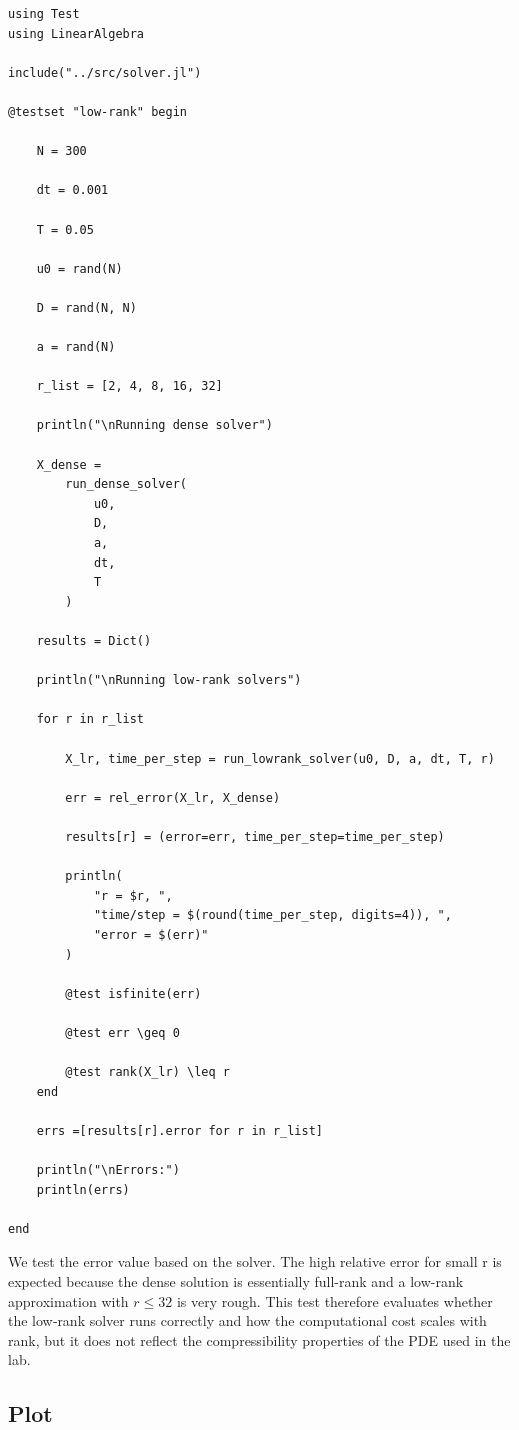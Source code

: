 \documentclass[11pt]{report}
\begin{document}
\begin{lstlisting}
using Test
using LinearAlgebra

include("../src/solver.jl")

@testset "low-rank" begin

    N = 300

    dt = 0.001

    T = 0.05

    u0 = rand(N)

    D = rand(N, N)

    a = rand(N)

    r_list = [2, 4, 8, 16, 32]

    println("\nRunning dense solver")

    X_dense =
        run_dense_solver(
            u0,
            D,
            a,
            dt,
            T
        )

    results = Dict()

    println("\nRunning low-rank solvers")

    for r in r_list

        X_lr, time_per_step = run_lowrank_solver(u0, D, a, dt, T, r)

        err = rel_error(X_lr, X_dense)

        results[r] = (error=err, time_per_step=time_per_step)

        println(
            "r = $r, ",
            "time/step = $(round(time_per_step, digits=4)), ",
            "error = $(err)"
        )

        @test isfinite(err)

        @test err \geq 0

        @test rank(X_lr) \leq r
    end

    errs =[results[r].error for r in r_list]

    println("\nErrors:")
    println(errs)

end
\end{lstlisting}

We test the error value based on the solver. The high relative error for small r is expected because the dense solution is essentially full-rank and a low-rank approximation with $r \leq 32$ is very rough.
This test therefore evaluates whether the low‑rank solver runs correctly and how the computational cost scales with rank, but it does not reflect the compressibility properties of the PDE used in the lab.

\subsection{Plot}
\end{document}
